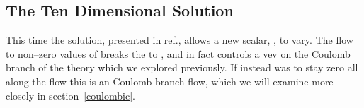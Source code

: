 \documentclass[a4paper,12pt]{article}
\begin{document}
\subsection{The Ten Dimensional Solution}

This time the solution, presented in ref.\cite{warnernew}, allows a
new scalar, \myHighlight{$\beta=\log\nu$}\coordHE{}, to vary.  The flow to non--zero values of
\myHighlight{$\beta$}\coordHE{} breaks the \coordHE{} to \coordHE{}, and \myHighlight{$\beta$}\coordHE{} in fact
controls a vev on the Coulomb branch of the \coordHE{} theory which
we explored previously. If instead \myHighlight{$\chi$}\coordHE{} was to stay zero all along
the flow this is an \coordHE{} Coulomb branch flow, which we will
examine more closely in section~\ref{coulombic}.
 
\end{document}
